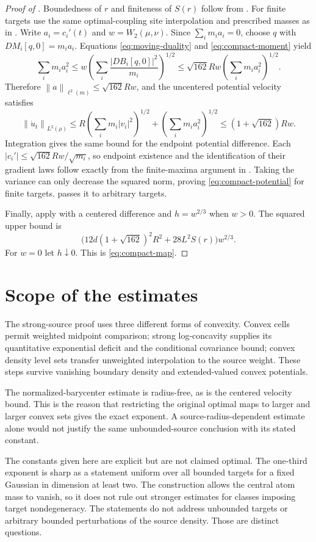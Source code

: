 \documentclass[11pt]{article}
\numberwithin{equation}{section}
\theoremstyle{remark}
\newcommand{\norm}[1]{\left\lVert #1\right\rVert}
\begin{document}
\begin{proof}[Proof of ]
Boundedness of $r$ and finiteness of $S(r)$ follow from . For finite targets use the same optimal-coupling site interpolation and prescribed masses as in . Write $a_i=c_i'(t)$ and $w=W_2(\mu,\nu)$. Since $\sum_i m_i a_i=0$, choose $q$ with $DM_i[q,0]=m_i a_i$. Equations \eqref{eq:moving-duality} and \eqref{eq:compact-moment} yield
\[
 \sum_i m_i a_i^2
 \le w\left(\sum_i\frac{|DB_i[q,0]|^2}{m_i}\right)^{1/2}
 \le\sqrt{162}Rw\left(\sum_i m_i a_i^2\right)^{1/2}.
\]
Therefore $\norm a_{\ell^2(m)}\le\sqrt{162}Rw$, and the uncentered potential velocity satisfies
\[
 \norm{\dot u_t}_{L^2(\rho)}
 \le R\left(\sum_i m_i|v_i|^2\right)^{1/2}
      +\left(\sum_i m_i a_i^2\right)^{1/2}
 \le(1+\sqrt{162})Rw.
\]
Integration gives the same bound for the endpoint potential difference. Each $|c_i'|\le\sqrt{162}Rw/\sqrt{m_i}$, so endpoint existence and the identification of their gradient laws follow exactly from the finite-maxima argument in . Taking the variance can only decrease the squared norm, proving \eqref{eq:compact-potential} for finite targets.  passes it to arbitrary targets.

Finally, apply  with a centered difference and $h=w^{2/3}$ when $w>0$. The squared upper bound is
\[
 \bigl(12d(1+\sqrt{162})^2R^2+28L^2S(r)\bigr)w^{2/3}.
\]
For $w=0$ let $h\downarrow0$. This is \eqref{eq:compact-map}.
\end{proof}

\section{Scope of the estimates}\label{sec:scope}
The strong-source proof uses three different forms of convexity. Convex cells permit weighted midpoint comparison; strong log-concavity supplies its quantitative exponential deficit and the conditional covariance bound; convex density level sets transfer unweighted interpolation to the source weight. These steps survive vanishing boundary density and extended-valued convex potentials.

The normalized-barycenter estimate is radius-free, as is the centered velocity bound. This is the reason that restricting the original optimal maps to larger and larger convex sets gives the exact exponent. A source-radius-dependent estimate alone would not justify the same unbounded-source conclusion with its stated constant.

The constants given here are explicit but are not claimed optimal. The one-third exponent is sharp as a statement uniform over all bounded targets for a fixed Gaussian in dimension at least two. The construction allows the central atom mass to vanish, so it does not rule out stronger estimates for classes imposing target nondegeneracy. The statements do not address unbounded targets or arbitrary bounded perturbations of the source density. Those are distinct questions.



\end{document}
